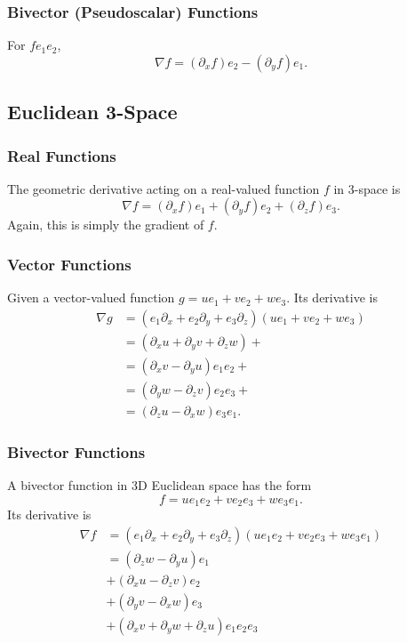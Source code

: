 	\subsubsection{Bivector (Pseudoscalar) Functions}
	
	For $fe_1e_2$,
	\[
	\nabla f = \left(\partial_x f\right) e_2 - \left(\partial_y f\right) e_1.
	\]
	
	\subsection{Euclidean 3-Space}
	
	\subsubsection{Real Functions}
	
	The geometric derivative acting on a real-valued function $f$ in 3-space is
	\[
	\nabla f = \left( \partial_x f\right) e_1  + \left( \partial_y f\right) e_2 + \left( \partial_z f\right) e_3.
	\]
	Again, this is simply the gradient of $f$.
	
	\subsubsection{Vector Functions}
	
	Given a vector-valued function $g = u e_1 + ve_2 + we_3.$ Its derivative is	
	\begin{align*}
	\nabla g & = \left(e_1\partial_x + e_2\partial_y + e_3\partial_z\right) \left(ue_1 + ve_2 + we_3\right) \\
	& = \left( \partial_x u + \partial_y v + \partial_z w\right) + \\
	& = \left( \partial_x v - \partial_y u\right)e_1e_2 + \\
	& = \left( \partial_y w - \partial_z v\right)e_2e_3 + \\
	& = \left( \partial_z u - \partial_x w\right)e_3e_1.
	\end{align*}	
	\subsubsection{Bivector Functions}
	A bivector function in 3D Euclidean space has the form
	\[
	f = ue_1e_2 + ve_2e_3 + we_3e_1.
	\]	
	Its derivative is	
	\begin{align*}
	\nabla f &= \left(e_1\partial_x + e_2\partial_y + e_3\partial_z\right) \left(ue_1e_2 + ve_2e_3 + we_3e_1\right) \\
	&= \left(\partial_zw - \partial_yu\right)e_1 \\
	&+ \left(\partial_xu - \partial_zv\right)e_2\\
	&+ \left(\partial_yv - \partial_xw\right)e_3\\
	&+ \left(\partial_xv + \partial_yw + \partial_zu\right)e_1e_2e_3\\
	\end{align*}

